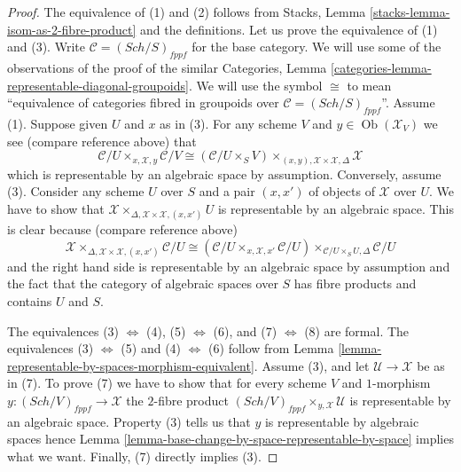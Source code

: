 \documentclass{stacks-project}
\theoremstyle{plain}
\theoremstyle{definition}
\theoremstyle{remark}
\numberwithin{equation}{subsection}
\def\Sch{\mathit{Sch}}
\def\Ob{\mathop{\mathrm{Ob}}\nolimits}
\begin{document}
\begin{proof}
The equivalence of (1) and (2) follows from
Stacks, Lemma \ref{stacks-lemma-isom-as-2-fibre-product}
and the definitions.
Let us prove the equivalence of (1) and (3).
Write $\mathcal{C} = (\Sch/S)_{fppf}$ for the base category.
We will use some of the observations of the proof of the similar
Categories, Lemma \ref{categories-lemma-representable-diagonal-groupoids}.
We will use the symbol $\cong$ to mean ``equivalence of categories fibred
in groupoids over $\mathcal{C} = (\Sch/S)_{fppf}$''.
Assume (1). Suppose given $U$ and $x$ as in (3). For any scheme $V$
and $y \in \Ob(\mathcal{X}_V)$ we see (compare reference above) that
$$
\mathcal{C}/U
\times_{x, \mathcal{X}, y}
\mathcal{C}/V
\cong
(\mathcal{C}/U \times_S V)
\times_{(x, y), \mathcal{X} \times \mathcal{X}, \Delta}
\mathcal{X}
$$
which is representable by an algebraic space by assumption. Conversely,
assume (3). Consider any scheme $U$ over $S$ and a pair $(x, x')$
of objects of $\mathcal{X}$ over $U$. We have to show that
$\mathcal{X} \times_{\Delta, \mathcal{X} \times \mathcal{X}, (x, x')} U$
is representable by an algebraic space. This is clear because
(compare reference above)
$$
\mathcal{X}
\times_{\Delta, \mathcal{X} \times \mathcal{X}, (x, x')}
\mathcal{C}/U
\cong
(\mathcal{C}/U \times_{x, \mathcal{X}, x'} \mathcal{C}/U)
\times_{\mathcal{C}/U \times_S U, \Delta}
\mathcal{C}/U
$$
and the right hand side is representable by an algebraic space by assumption
and the fact that the category of algebraic spaces over $S$ has fibre products
and contains $U$ and $S$.

\medskip\noindent
The equivalences
(3) $\Leftrightarrow$ (4),
(5) $\Leftrightarrow$ (6),
and
(7) $\Leftrightarrow$ (8)
are formal. The equivalences
(3) $\Leftrightarrow$ (5) and
(4) $\Leftrightarrow$ (6)
follow from
Lemma \ref{lemma-representable-by-spaces-morphism-equivalent}.
Assume (3), and let $\mathcal{U} \to \mathcal{X}$ be as in (7).
To prove (7) we have to show that for every scheme $V$ and $1$-morphism
$y : (\Sch/V)_{fppf} \to \mathcal{X}$ the $2$-fibre product
$(\Sch/V)_{fppf} \times_{y, \mathcal{X}} \mathcal{U}$
is representable by an algebraic space. Property (3) tells us
that $y$ is representable by algebraic spaces hence
Lemma \ref{lemma-base-change-by-space-representable-by-space}
implies what we want. Finally, (7) directly implies (3).
\end{proof}
\end{document}
